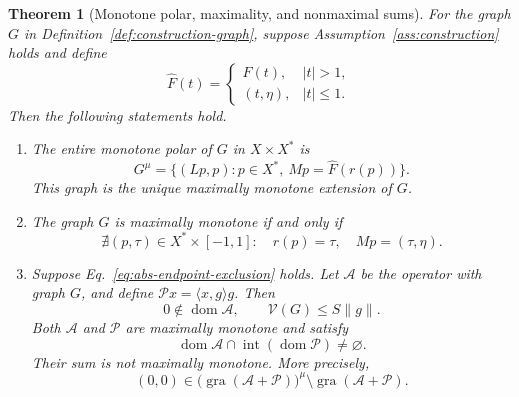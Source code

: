 \documentclass[11pt]{article}
\newcommand{\gra}{\operatorname{gra}}
\newcommand{\dom}{\operatorname{dom}}
\newcommand{\pair}[2]{\langle #1,#2\rangle}
\newtheorem{theorem}{Theorem}
\theoremstyle{definition}
\theoremstyle{remark}
\begin{document}
\begin{theorem}[Monotone polar, maximality, and nonmaximal sums]
\label{thm:endpoint-criterion}
For the graph $G$ in Definition~\ref{def:construction-graph},
suppose Assumption~\ref{ass:construction} holds and define
\[
\widehat F(t)=
\begin{cases}
F(t),&|t|>1,\\
(t,\eta),&|t|\le1.
\end{cases}
\]
Then the following statements hold.
\begin{enumerate}
\renewcommand{\theenumi}{\roman{enumi}}
\renewcommand{\labelenumi}{(\theenumi)}
\item\label{thm:polar-part} The entire monotone polar of $G$ in $X\times X^*$ is
\begin{equation}
G^\mu=\{(Lp,p):p\in X^*,\ Mp=\widehat F(r(p))\}.
\label{eq:abs-entire-polar}
\end{equation}
This graph is the unique maximally monotone extension of $G$.

\item\label{thm:maximality-part} The graph $G$ is maximally monotone if and only if
\begin{equation}
\nexists(p,\tau)\in X^*\times[-1,1]:
\quad r(p)=\tau,\quad Mp=(\tau,\eta).
\label{eq:abs-endpoint-exclusion}
\end{equation}

\item\label{thm:sum-part} Suppose Eq.~\eqref{eq:abs-endpoint-exclusion} holds.
Let $\mathcal A$ be the operator with graph $G$, and define
$\mathcal P x=\pair{x}{g}g$. Then
\[
0\notin\dom\mathcal A,\qquad \mathcal V(G)\le S\|g\|.
\]
Both $\mathcal A$ and $\mathcal P$ are maximally monotone and satisfy
\[
\dom\mathcal A\cap\operatorname{int}(\dom\mathcal P)\ne\varnothing.
\]
Their sum is not maximally monotone. More precisely,
\[
(0,0)\in
\bigl(\gra(\mathcal A+\mathcal P)\bigr)^\mu
\setminus\gra(\mathcal A+\mathcal P).
\]
\end{enumerate}
\end{theorem}
\end{document}
